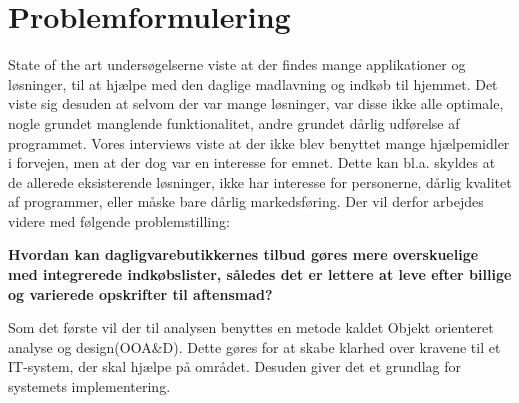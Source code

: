 \section{Problemformulering}\label{section:problemformulering}

State of the art undersøgelserne viste at der findes mange applikationer og løsninger, til at hjælpe med den daglige madlavning og indkøb til hjemmet.
Det viste sig desuden at selvom der var mange løsninger, var disse ikke alle optimale, nogle grundet manglende funktionalitet, andre grundet dårlig udførelse af programmet.
Vores interviews viste at der ikke blev benyttet mange hjælpemidler i forvejen, men at der dog var en interesse for emnet.
Dette kan bl.a. skyldes at de allerede eksisterende løsninger, ikke har interesse for personerne, dårlig kvalitet af programmer, eller måske bare dårlig markedsføring. Der vil derfor arbejdes videre med følgende problemstilling:

\textbf{Hvordan kan dagligvarebutikkernes tilbud gøres mere overskuelige med integrerede indkøbslister, således det er lettere at leve efter billige og varierede opskrifter til aftensmad?}

Som det første vil der til analysen benyttes en metode kaldet Objekt orienteret analyse og design(OOA\&D).
Dette gøres for at skabe klarhed over kravene til et IT-system, der skal hjælpe på området.
Desuden giver det et grundlag for systemets implementering.
